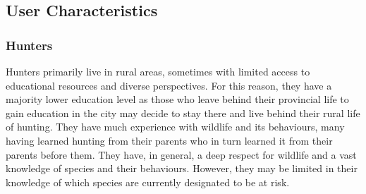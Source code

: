 \documentclass[]{article}
\begin{document}

\subsection{User Characteristics}
\label{sub:user_characteristics}
\subsubsection{Hunters}
Hunters primarily live in rural areas, sometimes with limited access to educational resources and diverse perspectives. For this reason, they have a majority lower education level 
as those who leave behind their provincial life to gain education in the city may decide to stay there and live behind their rural life of hunting. They have much experience with
 wildlife and its behaviours, many having learned hunting from their parents who in turn learned it from their parents before them. They have, in general,
 a deep respect for wildlife and a vast knowledge of species and their behaviours. However, they may be limited in their knowledge of which species are 
 currently designated to be at risk.
\end{document}
